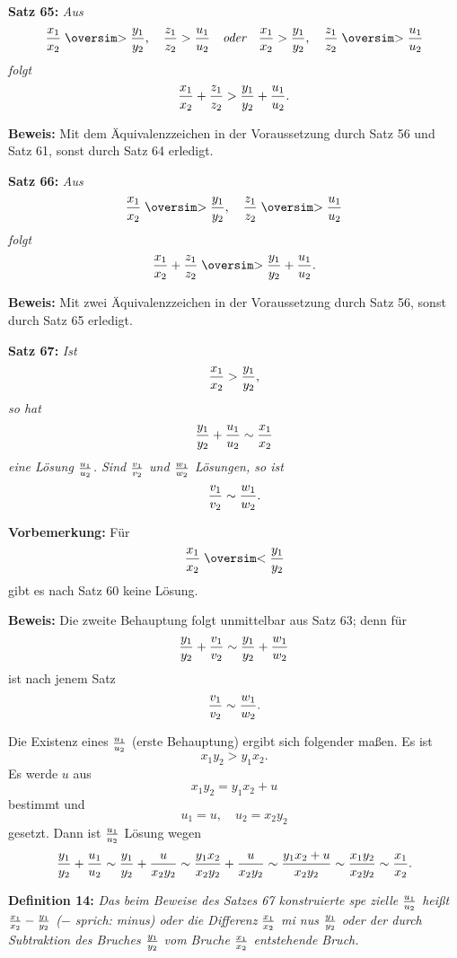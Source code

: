 
{\bf Satz 65:} {\it Aus
$${x_1 \over x_2} \gesim {y_1 \over y_2},\quad {z_1 \over z_2} > {u_1 \over u_2}\quad\hbox{\it oder}\quad{x_1 \over x_2} > {y_1 \over y_2},\quad {z_1 \over z_2} \gesim {u_1 \over u_2}$$
folgt
$${x_1 \over x_2} + {z_1 \over z_2} > {y_1 \over y_2} + {u_1 \over u_2}.$$}%

{\bf Beweis:} Mit dem \"Aquivalenzzeichen in der Voraussetzung
durch Satz 56 und Satz 61, sonst durch Satz 64 erledigt.
\medskip


{\bf Satz 66:} {\it Aus
$${x_1 \over x_2} \gesim {y_1 \over y_2},\quad {z_1 \over z_2} \gesim {u_1 \over u_2}$$
folgt
$${x_1 \over x_2} + {z_1 \over z_2} \gesim {y_1 \over y_2} + {u_1 \over u_2}.$$}%

{\bf Beweis:} Mit zwei \"Aquivalenzzeichen in der Voraussetzung
durch Satz 56, sonst durch Satz 65 erledigt.
\medskip


{\bf Satz 67:} {\it Ist
$${x_1 \over x_2} > {y_1 \over y_2},$$
so hat
$${y_1 \over y_2} + {u_1 \over u_2} \sim {x_1 \over x_2}$$
eine L\"osung $u_1 \over u_2$.  Sind $v_1 \over v_2$ und $w_1 \over w_2$ L\"osungen, so ist
$${v_1 \over v_2} \sim {w_1 \over w_2}.$$}%

{\bf Vorbemerkung:} F\"ur
$${x_1 \over x_2} \lesim {y_1 \over y_2}$$
gibt es nach Satz 60 keine L\"osung.

{\bf Beweis:} Die zweite Behauptung folgt unmittelbar aus Satz 63;
denn f\"ur
$${y_1 \over y_2} + {v_1 \over v_2} \sim {y_1 \over y_2} + {w_1 \over w_2}$$
ist nach jenem Satz
$${v_1 \over v_2} \sim {w_1 \over w_2}.$$

Die Existenz eines $u_1 \over u_2$ (erste Behauptung) ergibt sich folgender%
ma{\ss}en.  Es ist
$$x_1 y_2 > y_1 x_2.$$
Es werde $u$ aus
$$x_1 y_2 = y_1 x_2 + u$$
bestimmt und
$$u_1 = u,\quad u_2 = x_2 y_2$$
gesetzt.  Dann ist $u_1 \over u_2$ L\"osung wegen
$${y_1 \over y_2} + {u_1 \over u_2} \sim {y_1 \over y_2} + {u \over x_2 y_2} \sim {y_1 x_2 \over x_2 y_2} + {u \over x_2 y_2} \sim {y_1 x_2 + u \over x_2 y_2} \sim {x_1 y_2 \over x_2 y_2} \sim {x_1 \over x_2}.$$
\medskip

{\bf Definition 14:} {\it Das beim Beweise des Satzes 67 konstruierte spe%
zielle $u_1 \over u_2$ hei{\ss}t ${x_1 \over x_2} - {y_1 \over y_2}$ {\rm ($-$ sprich: minus)} oder die Differenz $x_1 \over x_2$ mi%
nus $y_1 \over y_2$ oder der durch Subtraktion des Bruches $y_1 \over y_2$ vom Bruche $x_1 \over x_2$
entstehende Bruch.}

